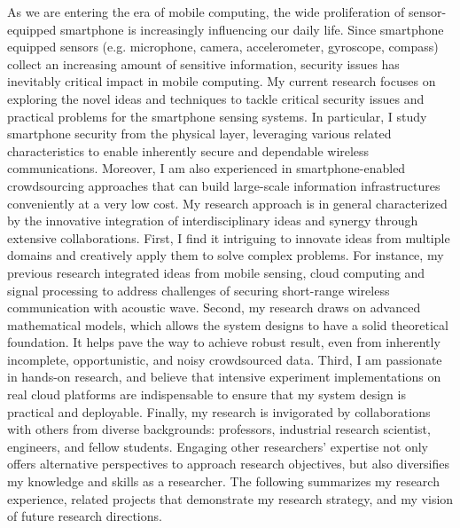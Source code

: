 \documentclass[11pt]{article}
\begin{document}








As we are entering the era of mobile computing, the wide proliferation of sensor-equipped smartphone is increasingly influencing our daily life. Since smartphone equipped sensors (e.g. microphone, camera, accelerometer, gyroscope, compass) collect an increasing amount of sensitive information, security issues has inevitably critical impact in mobile computing. My current research focuses on exploring the novel ideas and techniques to tackle critical security issues and practical problems for the smartphone sensing systems. In particular, I study smartphone security from the physical layer, leveraging various related characteristics to enable inherently secure and dependable wireless communications. Moreover, I am also experienced in smartphone-enabled crowdsourcing approaches that can build large-scale information infrastructures conveniently at a very low cost. My research approach is in general characterized by the innovative integration of interdisciplinary ideas and synergy through extensive collaborations. First, I find it intriguing to innovate ideas from multiple domains and creatively apply them to solve complex problems. For instance, my previous research integrated ideas from mobile sensing, cloud computing and signal processing to address challenges of securing short-range wireless communication with acoustic wave. Second, my research draws on advanced mathematical models, which allows the system designs to have a solid theoretical foundation. It helps pave the way to achieve robust result, even from inherently incomplete, opportunistic, and noisy crowdsourced data. Third, I am passionate in hands-on research, and believe that intensive experiment implementations on real cloud platforms are indispensable to ensure that my system design is practical and deployable. Finally, my research is invigorated by collaborations with others from diverse backgrounds: professors, industrial research scientist, engineers, and fellow students. Engaging other researchers' expertise not only offers alternative perspectives to approach research objectives, but also diversifies my knowledge and skills as a researcher. The following summarizes my research experience, related projects that demonstrate my research strategy, and my vision of future research directions.
\end{document}
